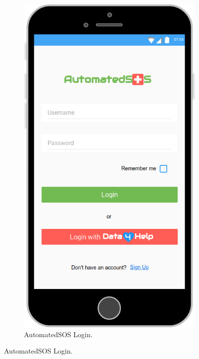 \begin{figure}[ht]
  \begin{subfigure}[ht]{0.38\linewidth}
    \includegraphics[width=\linewidth]{images/Mock-up/AutomatedSOS_Login.png}
    \caption{AutomatedSOS Login.}
  \end{subfigure}
\end{figure}

